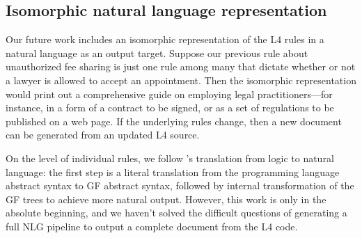 \documentclass[11pt]{article}
\newcommand{\todoregina}[2][]{\todo[color=red!40,#1]{Regina: #2}}
\def\scasp{s(CASP) }
\begin{document}


 

\subsection{Isomorphic natural language representation}
\label{sec:NLrep}

Our future work includes an isomorphic representation of the L4 rules in a natural language as an output target. 
Suppose our previous rule about unauthorized fee sharing is just one rule among many that dictate whether or not a lawyer is allowed to accept an appointment.
Then the isomorphic representation would print out a comprehensive guide on employing legal practitioners---for instance, in a form of a contract to be signed, or as a set of regulations to be published on a web page. If the underlying rules change, then a new document can be generated from an updated L4 source.

On the level of individual rules, we follow \citeauthor{ranta2011translating}'s \citeyearpar{ranta2011translating} translation from logic to natural language:
the first step is a literal translation from the programming language abstract syntax to GF abstract syntax, 
followed by internal transformation of the GF trees to achieve more natural output.
However, this work is only in the absolute beginning, and we haven't solved the difficult questions of generating a full NLG pipeline \cite{reiter_dale_2000} to output a complete document from the L4 code.






\end{document}
